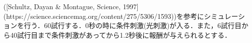 ([Schultz, Dayan & Montague, Science, 1997](https://science.sciencemag.org/content/275/5306/1593))を参考にシミュレーションを行う．60試行する．0秒の時に条件刺激(光刺激)が入る．また，6試行目から40試行目まで条件刺激があってから1.2秒後に報酬が与えられるとする．
